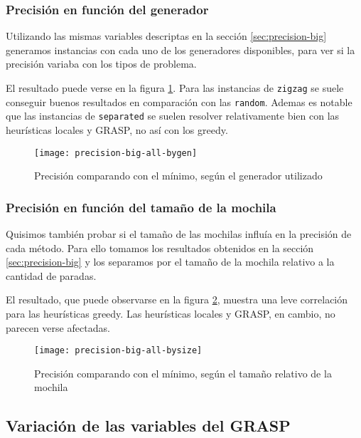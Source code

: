 \subsubsection{Precisión en función del generador}

Utilizando las mismas variables descriptas en la sección \ref{sec:precision-big} generamos instancias con cada uno de los generadores
disponibles, para ver si la precisión variaba con los tipos de problema.

El resultado puede verse en la figura \ref{fig:precision-big-all-bygen}.
Para las instancias de \texttt{zigzag} se suele conseguir buenos resultados en comparación con las \texttt{random}.
Ademas es notable que las instancias de \texttt{separated} se suelen resolver relativamente bien con las heurísticas locales y GRASP,
no así con los greedy.

\begin{figure}[H]
    \centering
    \texttt{[image: precision-big-all-bygen]}
    \caption{Precisión comparando con el mínimo, según el generador utilizado}
    \label{fig:precision-big-all-bygen}
\end{figure}

\subsubsection{Precisión en función del tamaño de la mochila}

Quisimos también probar si el tamaño de las mochilas influía en la precisión de cada método.
Para ello tomamos los resultados obtenidos en la sección \ref{sec:precision-big} y los separamos
por el tamaño de la mochila relativo a la cantidad de paradas.

El resultado, que puede observarse en la figura \ref{fig:precision-big-all-bysize},
muestra una leve correlación para las heurísticas greedy. Las heurísticas locales y GRASP, en cambio, no parecen verse afectadas.

\begin{figure}[H]
    \centering
    \texttt{[image: precision-big-all-bysize]}
    \caption{Precisión comparando con el mínimo, según el tamaño relativo de la mochila}
    \label{fig:precision-big-all-bysize}
\end{figure}

\subsection{Variación de las variables del GRASP}

